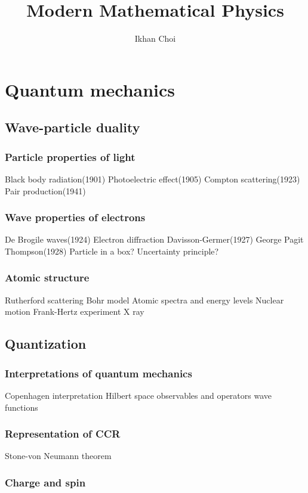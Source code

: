 \documentclass{../note}
\begin{document}
\title{Modern Mathematical Physics}
\author{Ikhan Choi}
\maketitle
\tableofcontents

\part{Quantum mechanics}
\chapter{Wave-particle duality}
\section{Particle properties of light}
Black body radiation(1901)
Photoelectric effect(1905)
Compton scattering(1923)
Pair production(1941)

\section{Wave properties of electrons}
De Brogile waves(1924)
Electron diffraction
	Davisson-Germer(1927)
	George Pagit Thompson(1928)
Particle in a box?
Uncertainty principle?

\section{Atomic structure}
Rutherford scattering
Bohr model
	Atomic spectra and energy levels
	Nuclear motion
	Frank-Hertz experiment
X ray



\chapter{Quantization}
\section{Interpretations of quantum mechanics}
Copenhagen interpretation
Hilbert space
observables and operators
wave functions
\section{Representation of CCR}
Stone-von Neumann theorem
\section{Charge and spin}
\end{document}

